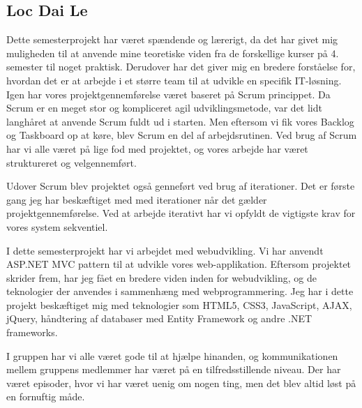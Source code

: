 \subsection*{Loc Dai Le}

Dette semesterprojekt har været spændende og lærerigt, da det har givet mig muligheden til at anvende mine teoretiske viden fra de forskellige kurser på 4. semester til noget praktisk. Derudover har det giver mig en bredere forståelse for, hvordan det er at arbejde i et større team til at udvikle en specifik IT-løsning. 
Igen har vores projektgennemførelse været baseret på Scrum princippet. Da Scrum er en meget stor og kompliceret agil udviklingsmetode, var det lidt langhåret at anvende Scrum fuldt ud i starten. Men eftersom vi fik vores Backlog og Taskboard op at køre, blev Scrum en del af arbejdsrutinen.   
Ved brug af Scrum har vi alle været på lige fod med projektet, og vores arbejde har været struktureret og velgennemført.

Udover Scrum blev projektet også genneført ved brug af iterationer. Det er første gang jeg har beskæftiget med med iterationer når det gælder projektgennemførelse. Ved at arbejde iterativt har vi opfyldt de vigtigste krav for vores system sekventiel. 

I dette semesterprojekt har vi arbejdet med webudvikling. Vi har anvendt ASP.NET MVC pattern til at udvikle vores web-applikation. Eftersom projektet skrider frem, har jeg fået en bredere viden inden for webudvikling, og de teknologier der anvendes i sammenhæng med webprogrammering. Jeg har i dette projekt beskæftiget mig med teknologier som HTML5, CSS3, JavaScript, AJAX, jQuery, håndtering af databaser med Entity Framework og andre .NET frameworks. 


I gruppen har vi alle været gode til at hjælpe hinanden, og kommunikationen mellem gruppens medlemmer har været på en tilfredsstillende niveau. Der har været episoder, hvor vi har været uenig om nogen ting, men det blev altid løst på en fornuftig måde. 